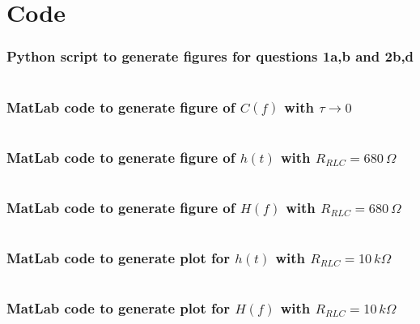 \documentclass[a4paper, onecolumn, 12pt]{IEEEtran}
\begin{document}
\section{Code}
\label{app:code}

\subsubsection{Python script to generate figures for questions 1a,b and 2b,d}
\label{sec:code_q1_a_b_q2_b_d}
    \begin{mdframed}
        \inputminted{python}{./code/practical_2.py}
    \end{mdframed}

\subsubsection{MatLab code to generate figure of $C(f)$ with $\tau \to 0$}
\label{sec:code_q1_c}
    \begin{mdframed}
        \inputminted{Matlab}{./code/Q1c_Plot.m}
    \end{mdframed}

\subsubsection{MatLab code to generate figure of $h(t)$ with $R_{RLC} = 680\,\Omega$}
\label{sec:code_q2_e_ht}
    \begin{mdframed}
        \inputminted{Matlab}{./code/Q2e_ht_Plot.m}
    \end{mdframed}

\subsubsection{MatLab code to generate figure of $H(f)$ with $R_{RLC} = 680\,\Omega$}
\label{sec:code_q2_e_Hf}
    \begin{mdframed}
        \inputminted{Matlab}{./code/Q2e_Hf_Plot.m}
    \end{mdframed}

\subsubsection{MatLab code to generate plot for $h(t)$ with $R_{RLC} = 10\,k\Omega$}
\label{sec:code_q2_f_ht}
    \begin{mdframed}
        \inputminted{Matlab}{./code/Q2f_ht_Plot.m}
    \end{mdframed}

\subsubsection{MatLab code to generate plot for $H(f)$ with $R_{RLC} = 10\,k\Omega$}
\label{sec:code_q2_f_Hf}
    \begin{mdframed}
        \inputminted{Matlab}{./code/Q2f_Hf_Plot.m}
    \end{mdframed}
\end{document}
